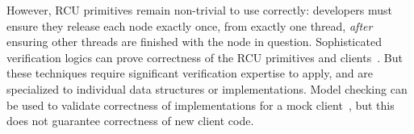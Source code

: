 However, RCU primitives remain non-trivial to use correctly: developers must ensure they release each node exactly once, from exactly one thread, \emph{after} ensuring other threads are finished with the node in question.
Sophisticated verification logics can prove correctness of the RCU primitives and clients~\cite{Gotsman:2013:VCM:2450268.2450289,fu2010reasoning,verrcu,Mandrykin:2016:TDV:3001219.3001297}.
But these techniques require significant verification expertise to apply, and are specialized to individual data structures or implementations.
Model checking can be used to validate correctness of implementations for a mock client~\cite{LiangMKM16,Desnoyers:2013:MSM:2506164.2506174,Kokologiannakis:2017:SMC:3092282.3092287,DBLP:conf/cav/AlglaveKT13}, but this does not guarantee correctness of new client code.


